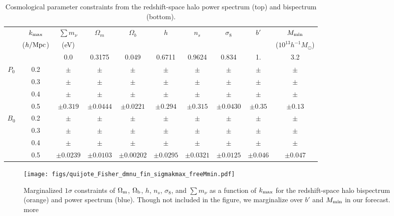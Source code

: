 \documentclass[12pt, letterpaper, preprint]{aastex62}
\newcommand{\Om}{\Omega_{\rm m}}
\newcommand{\Ob}{\Omega_{\rm b}}
\newcommand{\smnu}{\sum m_\nu}
\newcommand{\sig}{\sigma_8}
\newcommand{\ch}[1]{{\color{orange}{\bf CH:} #1}}
\begin{document}
\begin{table}
    \caption{Cosmological parameter constraints from the redshift-space halo power spectrum (top) and bispectrum (bottom).} 
\begin{center} 
    \begin{tabular}{cccccccccc} \toprule
         & $k_{\rm max}$ & $\smnu$ & $\Omega_m$ & $\Omega_b$ & $h$ & $n_s$ & $\sig$ & $b'$ & $M_{\rm min}$ \\
         & ({\footnotesize $h/{\rm Mpc}$}) &({\footnotesize eV}) & & & & & & & ({\footnotesize $10^{13} h^{-1}M_\odot$}) \\[3pt] \hline\hline

                    &     & 0.0 & 0.3175 & 0.049 & 0.6711 & 0.9624 & 0.834 & 1. & 3.2  \\ 
        $P_0$    & 0.2 & $\pm$ & $\pm$ & $\pm$ & $\pm$ & $\pm$ & $\pm$ & $\pm$ & $\pm$ \\ 
                    & 0.3 & $\pm$ & $\pm$ & $\pm$ & $\pm$ & $\pm$ & $\pm$ & $\pm$ & $\pm$ \\ 
                    & 0.4 & $\pm$ & $\pm$ & $\pm$ & $\pm$ & $\pm$ & $\pm$ & $\pm$ & $\pm$ \\ 
                    & 0.5 & $\pm0.319$ & $\pm 0.0444$ & $\pm 0.0221$ & $\pm0.294$ & $\pm0.315$ & $\pm0.0430$ & $\pm0.35$ & $\pm0.13$  \\ \hline
        $B_0$  & 0.2 & $\pm$ & $\pm$ & $\pm$ & $\pm$ & $\pm$ & $\pm$ & $\pm$ & $\pm$ \\ 
                            & 0.3 & $\pm$ & $\pm$ & $\pm$ & $\pm$ & $\pm$ & $\pm$ & $\pm$ & $\pm$ \\ 
                            & 0.4 & $\pm$ & $\pm$ & $\pm$ & $\pm$ & $\pm$ & $\pm$ & $\pm$ & $\pm$ \\ 
                            & 0.5 & $\pm0.0239$ & $\pm0.0103$ & $\pm0.00202$ & $\pm0.0295$ & $\pm0.0321$ & $\pm0.0125$ & $\pm0.046$ & $\pm0.047$ \\[3pt]
    \hline
\end{tabular} \label{tab:forecast}
\end{center}
\end{table}

\begin{figure}
\begin{center}
    \texttt{[image: figs/quijote\_Fisher\_dmnu\_fin\_sigmakmax\_freeMmin.pdf]} 
    \caption{Marginalized $1\sigma$ constraints of $\Om$, $\Ob$, $h$, $n_s$, $\sig$, and $\smnu$ 
    as a function of $k_{\rm max}$ for the redshift-space halo bispectrum (orange) and power 
    spectrum (blue). Though not included in the figure, we marginalize over $b'$ and $M_{\rm min}$
    in our forecast.\ch{more}}
\label{fig:fish_kmax}
\end{center}
\end{figure}
\end{document}
